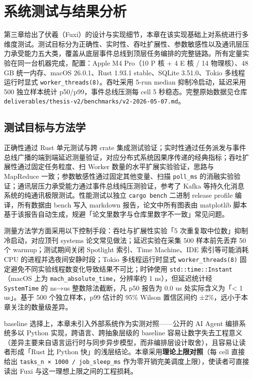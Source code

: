 \section{系统测试与结果分析}

第三章给出了伏羲（Fuxi）的设计与实现细节，本章在该实现基础上对系统进行多维度测试。测试目标分为正确性、实时性、吞吐扩展性、参数敏感性以及通讯层压力承受能力五大类，覆盖从底层事件总线到顶层任务编排的完整链路。所有定量实验在同一台机器完成，配置：Apple M4 Pro（10 P 核 + 4 E 核 / 14 物理核）、48 GB 统一内存、macOS 26.0.1、Rust 1.93.1 stable、SQLite 3.51.0、Tokio 多线程运行时显式 \texttt{worker\_threads(8)}。吞吐采用 5-run median 抑制冷启动，延迟采用 500 独立样本统计 p50/p99，事件总线压测每 cell 5 秒稳态。完整原始数据见仓库 \texttt{deliverables/thesis-v2/benchmarks/v2-2026-05-07.md}。

\subsection{测试目标与方法学}

正确性通过 Rust 单元测试与跨 crate 集成测试验证；实时性通过任务派发与事件总线广播的端到端延迟测量验证，对应分布式系统因果序传递的经典指标\cite{lamport1978time}；吞吐扩展性通过固定任务粒度、扫 Worker 数量的水平扩展实验验证，思路与 MapReduce\cite{dean2004mapreduce} 一致；参数敏感性通过固定其他变量、扫描 \texttt{poll\_ms} 的消融实验验证；通讯层压力承受能力通过事件总线纯压测验证，参考了 Kafka 等持久化消息系统的纯通讯极限测试\cite{kreps2011kafka}。性能测试以独立 \texttt{cargo bench} 二进制 release profile 编译，所有数据由 bench 写入 markdown 报告，论文中所有图表由 matplotlib 脚本基于该报告自动生成，规避「论文里数字与仓库里数字不一致」常见问题。

测量方法学方面采用以下控制手段：吞吐与扩展性实验「5 次重复取中位数」抑制冷启动，对应顶刊 systems 论文常见做法；延迟实验在采集 500 样本前先丢弃 50 个 warmup；测试期间关闭 Spotlight 索引、Time Machine、IDE 索引等可能消耗 CPU 的进程并选夜间安静时段；Tokio 多线程运行时显式 \texttt{worker\_threads(8)} 固定避免不同实验线程数变化导致结果不可比；时钟使用 \texttt{std::time::Instant}（macOS 上为 \texttt{mach\_absolute\_time}，分辨率约 1 ns），但延迟统计经 \texttt{SystemTime} 的 ns→us 整数除法截断，凡 p50 报告为 0.0 us 处实际含义为「< 1 us」。基于 500 个独立样本，p99 估计的 95\% Wilson 置信区间约 ±2\%，远小于本章关注的数量级差异。

baseline 选择上，本章未引入外部系统作为实测对照——公开的 AI Agent 编排系统多以 Python 实现，跨语言、跨抽象层级的 baseline 容易让数字失去工程意义（差异主要来自语言运行时与同步异步模型，而非编排层设计取舍），且容易让读者形成「Rust 比 Python 快」的浅层结论。本章采用\textbf{理论上限对照}（每 cell 直接给出 \texttt{tasks\_n × 1000 / job\_sleep\_ms} 作为零开销完美调度上限），使读者可直接读出 Fuxi 与这一理想上限之间的工程损耗。

